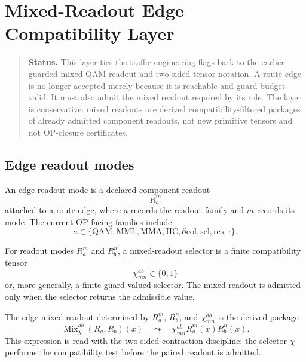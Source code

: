\clearpage
\section{Mixed-Readout Edge Compatibility Layer}
\label{sec:v410r18-mixed-readout-edge-compatibility}

\begin{quote}\small
\noindent\textbf{Status.}
This layer ties the traffic-engineering flags back to the earlier guarded
mixed QAM readout and two-sided tensor notation. A route edge is no longer
accepted merely because it is reachable and guard-budget valid. It must also
admit the mixed readout required by its role. The layer is conservative: mixed
readouts are derived compatibility-filtered packages of already admitted
component readouts, not new primitive tensors and not OP-closure certificates.
\end{quote}

\subsection{Edge readout modes}
\label{subsec:v410r18-edge-readout-modes}

\begin{definition}
\label{def:v410r18-edge-readout-mode}
An edge readout mode is a declared component readout
\[
 R_a^m
\]
attached to a route edge, where \(a\) records the readout family and \(m\)
records its mode. The current OP-facing families include
\[
 a\in
 \{\mathrm{QAM},\mathrm{MML},\mathrm{MMA},\mathrm{HC},
 \partial\mathrm{col},\mathrm{sel},\mathrm{res},\tau\}.
\]
\end{definition}

\begin{definition}
\label{def:v410r18-mixed-readout-selector}
For readout modes \(R_a^m\) and \(R_b^n\), a mixed-readout selector is a finite
compatibility tensor
\[
 \chi^{ab}_{mn}\in\{0,1\}
\]
or, more generally, a finite guard-valued selector. The mixed readout is
admitted only when the selector returns the admissible value.
\end{definition}

\begin{definition}
\label{def:v410r18-edge-mixed-readout}
The edge mixed readout determined by \(R_a^m\), \(R_b^n\), and
\(\chi^{ab}_{mn}\) is the derived package
\[
 \operatorname{Mix}_{\chi}^{ab}(R_a,R_b)(x)
 \quad\leadsto\quad
 \chi^{ab}_{mn}R_a^m(x)R_b^n(x).
\]
This expression is read with the two-sided contraction discipline: the selector
\(\chi\) performs the compatibility test before the paired readout is admitted.
\end{definition}

